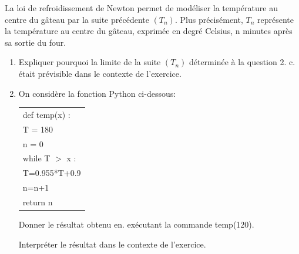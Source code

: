 \begin{enumerate}
La loi de refroidissement de Newton permet de modéliser la température au centre du gâteau par la suite précédente $\left(T_n\right)$. Plus précisément, $T_n$ représente la température au centre du gâteau, exprimée en degré Celsius, n minutes après sa sortie du four.
	\begin{enumerate}
		\item Expliquer pourquoi la limite de la suite $\left(T_n\right)$ déterminée à la question 2. c. était prévisible dans le contexte de l'exercice.
		\item On considère la fonction Python ci-dessous:
		\begin{center}
		\begin{tabular}{|l|}\hline
def temp(x) :\\
\quad T = 180\\
\quad n = 0\\
\quad while T $>$ x :\\
\qquad T=0.955*T+0.9\\
\qquad n=n+1\\
\quad return n\\ \hline
\end{tabular}
\end{center}
Donner le résultat obtenu en. exécutant la commande temp(120).

Interpréter le résultat dans le contexte de l'exercice.
	\end{enumerate}
\end{enumerate}

\bigskip
